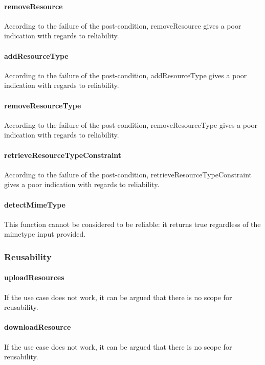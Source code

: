 \documentclass[a4paper]{article}
\begin{document}
\paragraph{removeResource}
According to the failure of the post-condition, removeResource gives a poor indication with regards to reliability.

\paragraph{addResourceType}
According to the failure of the post-condition, addResourceType gives a poor indication with regards to reliability.

\paragraph{removeResourceType}
According to the failure of the post-condition, removeResourceType gives a poor indication with regards to reliability.

\paragraph{retrieveResourceTypeConstraint}
According to the failure of the post-condition, retrieveResourceTypeConstraint gives a poor indication with regards to reliability.

\paragraph{detectMimeType}
This function cannot be considered to be reliable: it returns true regardless of the mimetype input provided. 

\subsubsection {Reusability}

\paragraph{uploadResources}
If the use case does not work, it can be argued that there is no scope for reusability.

\paragraph{downloadResource}
If the use case does not work, it can be argued that there is no scope for reusability.
\end{document}
